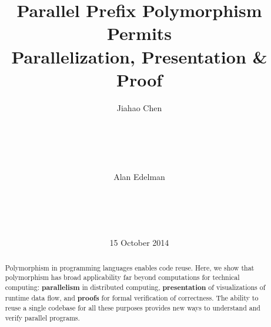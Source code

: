 \documentclass{sig-alternate}
\begin{document}
%

\title{Parallel Prefix Polymorphism Permits \\
Parallelization, Presentation \& Proof}


\author{
\alignauthor
Jiahao Chen\\
       \\
       \\
       \\
       \\
       \\
\alignauthor
Alan Edelman\\
       \\
       \\
       \\
       \\
}

\date{15 October 2014}

\maketitle

\begin{abstract}
Polymorphism in programming languages enables code reuse. Here, we show that
polymorphism has broad applicability far beyond computations for technical
computing: \textbf{parallelism} in distributed computing, \textbf{presentation}
of visualizations of runtime data flow, and \textbf{proofs} for formal
verification of correctness. The ability to reuse a single codebase for all
these purposes provides new ways to understand and verify parallel programs.
\end{abstract}
\end{document}

